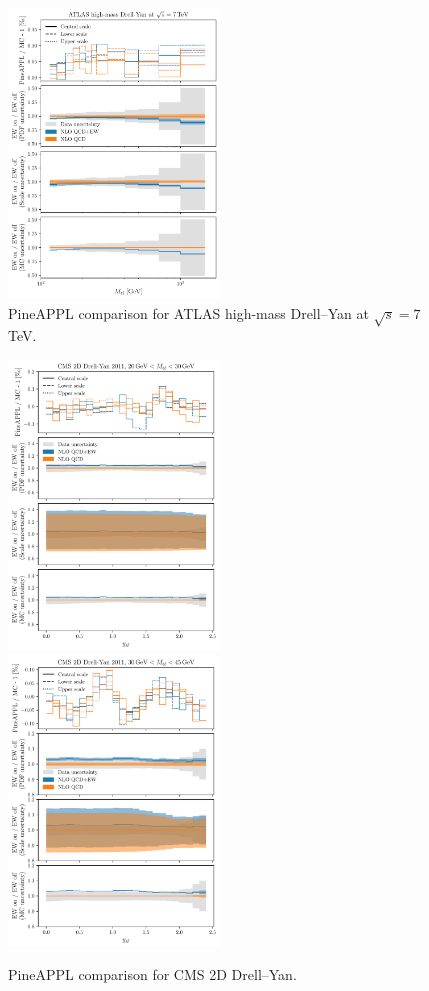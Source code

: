 \begin{figure}
    \centering
    \includegraphics[width=0.5\textwidth]{figures/pineappl_ATLASZHIGHMASS49FB}
    \caption{PineAPPL comparison for ATLAS high-mass Drell--Yan at $\sqrt{s}=7$ TeV.}
    \label{fig:atlaszhighmass49fb}
\end{figure}

\begin{figure}
    \centering
    \includegraphics[width=0.5\textwidth]{figures/pineappl_CMSDY2D11_bin1}%
    \includegraphics[width=0.5\textwidth]{figures/pineappl_CMSDY2D11_bin2}
    \caption{PineAPPL comparison for CMS 2D Drell--Yan.}
    \label{fig:cmsdy2d11_bins12}
\end{figure}

